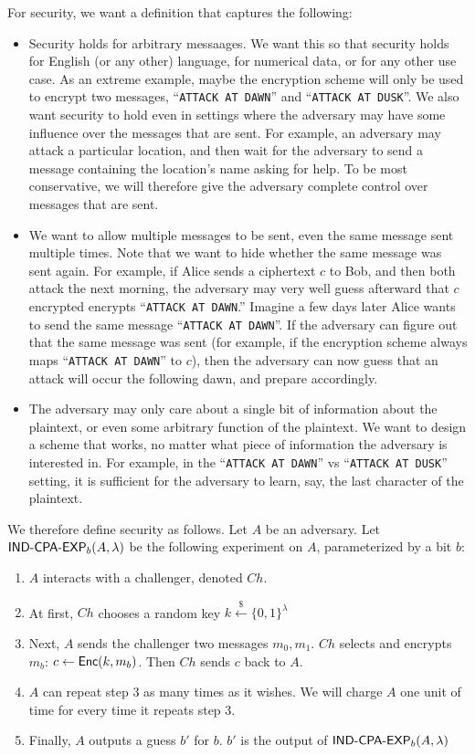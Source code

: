 For security, we want a definition that captures the following:
\begin{itemize}
	\item Security holds for arbitrary messaages.  We want this so that security holds for English (or any other) language, for numerical data, or for any other use case.  As an extreme example, maybe the encryption scheme will only be used to encrypt two messages, ``\texttt{ATTACK AT DAWN}'' and ``\texttt{ATTACK AT DUSK}''.  We also want security to hold even in settings where the adversary may have some influence over the messages that are sent.  For example, an adversary may attack a particular location, and then wait for the adversary to send a message containing the location's name asking for help.  To be most conservative, we will therefore give the adversary complete control over messages that are sent.
	\item We want to allow multiple messages to be sent, even the same message sent multiple times.  Note that we want to hide whether the same message was sent again.  For example, if Alice sends a ciphertext $c$ to Bob, and then both attack the next morning, the adversary may very well guess afterward that $c$ encrypted encrypts ``\texttt{ATTACK AT DAWN}.''  Imagine a few days later Alice wants to send the same message ``\texttt{ATTACK AT DAWN}''.  If the adversary can figure out that the same message was sent (for example, if the encryption scheme always maps ``\texttt{ATTACK AT DAWN}'' to $c$), then the adversary can now guess that an attack will occur the following dawn, and prepare accordingly.
	\item The adversary may only care about a single bit of information about the plaintext, or even some arbitrary function of the plaintext.  We want to design a scheme that works, no matter what piece of information the adversary is interested in.  For example, in the ``\texttt{ATTACK AT DAWN}'' vs ``\texttt{ATTACK AT DUSK}'' setting, it is sufficient for the adversary to learn, say, the last character of the plaintext.
\end{itemize}

We therefore define security as follows.  Let $A$ be an adversary.  Let $\text{\sf IND-CPA-EXP}_b(A,\lambda)$ be the following experiment on $A$, parameterized by a bit $b$:
\begin{enumerate}
	\item $A$ interacts with a challenger, denoted $Ch$.
	\item At first, $Ch$ chooses a random key $k\stackrel{\$}{\gets}\{0,1\}^\lambda$
	\item Next, $A$ sends the challenger two messages $m_0,m_1$.  $Ch$ selects and encrypts $m_b$: $c\gets{\sf Enc}(k,m_b)$.  Then $Ch$ sends $c$ back to $A$.
	\item $A$ can repeat step 3 as many times as it wishes.  We will charge $A$ one unit of time for every time it repeats step 3.
	\item Finally, $A$ outputs a guess $b'$ for $b$.  $b'$ is the output of $\text{\sf IND-CPA-EXP}_b(A,\lambda)$
\end{enumerate}

